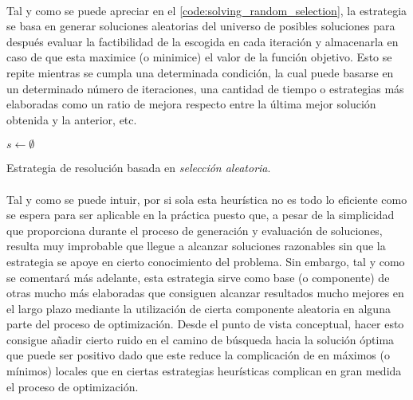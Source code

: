 \documentclass{subfiles}
\begin{document}
        \paragraph{}
        Tal y como se puede apreciar en el \cref{code:solving_random_selection}, la estrategia se basa en generar soluciones aleatorias del universo de posibles soluciones para después evaluar la factibilidad de la escogida en cada iteración y almacenarla en caso de que esta maximice (o minimice) el valor de la función objetivo. Esto se repite mientras se cumpla una determinada condición, la cual puede basarse en un determinado número de iteraciones, una cantidad de tiempo o estrategias más elaboradas como un ratio de mejora respecto entre la última mejor solución obtenida y la anterior, etc.

        \begin{algorithm}[ht]
          \SetAlgoLined
          $s \gets \emptyset$\;
          \caption{Estrategia de resolución basada en \emph{selección aleatoria}.}
          \label{code:solving_random_selection}
        \end{algorithm}

        \paragraph{}
        Tal y como se puede intuir, por si sola esta heurística no es todo lo eficiente como se espera para ser aplicable en la práctica puesto que, a pesar de la simplicidad que proporciona durante el proceso de generación y evaluación de soluciones, resulta muy improbable que llegue a alcanzar soluciones razonables sin que la estrategia se apoye en cierto conocimiento del problema. Sin embargo, tal y como se comentará más adelante, esta estrategia sirve como base (o componente) de otras mucho más elaboradas que consiguen alcanzar resultados mucho mejores en el largo plazo mediante la utilización de cierta componente aleatoria en alguna parte del proceso de optimización. Desde el punto de vista conceptual, hacer esto consigue añadir cierto ruido en el camino de búsqueda hacia la solución óptima que puede ser positivo dado que este reduce la complicación de  en máximos (o mínimos) locales que en ciertas estrategias heurísticas complican en gran medida el proceso de optimización.
\end{document}
